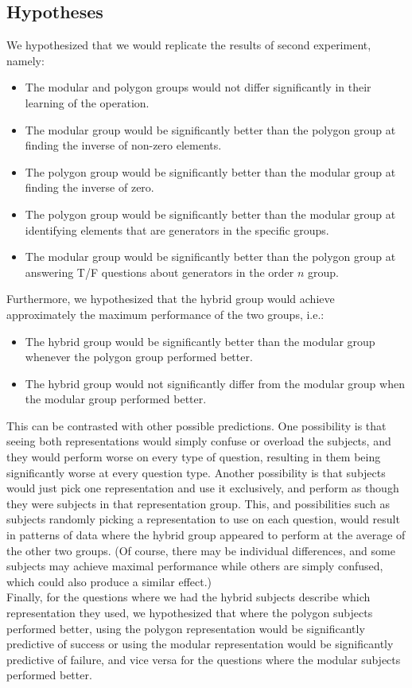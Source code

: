 \documentclass[11pt]{article}
\begin{document}
\subsection{Hypotheses}
We hypothesized that we would replicate the results of second experiment, namely: 
\begin{itemize} 
\item The modular and polygon groups would not differ significantly in their learning of the operation.
\item The modular group would be significantly better than the polygon group at finding the inverse of non-zero elements.
\item The polygon group would be significantly better than the modular group at finding the inverse of zero.
\item The polygon group would be significantly better than the modular group at identifying elements that are generators in the specific groups.
\item The modular group would be significantly better than the polygon group at answering T/F questions about generators in the order $n$ group.
\end{itemize}
Furthermore, we hypothesized that the hybrid group would achieve approximately the maximum performance of the two groups, i.e.:
\begin{itemize}
\item The hybrid group would be significantly better than the modular group whenever the polygon group performed better.
\item The hybrid group would not significantly differ from the modular group when the modular group performed better.
\end{itemize}
This can be contrasted with other possible predictions. One possibility is that seeing both representations would simply confuse or overload the subjects, and they would perform worse on every type of question, resulting in them being significantly worse at every question type. Another possibility is that subjects would just pick one representation and use it exclusively, and perform as though they were subjects in that representation group. This, and possibilities such as subjects randomly picking a representation to use on each question, would result in patterns of data where the hybrid group appeared to perform at the average of the other two groups. (Of course, there may be individual differences, and some subjects may achieve maximal performance while others are simply confused, which could also produce a similar effect.)\\[11pt]
Finally, for the questions where we had the hybrid subjects describe which representation they used, we hypothesized that where the polygon subjects performed better, using the polygon representation would be significantly predictive of success or using the modular representation would be significantly predictive of failure, and vice versa for the questions where the modular subjects performed better.
\end{document}
